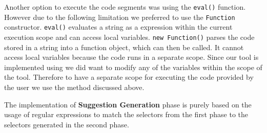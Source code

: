 Another option to execute the \javascript code segments was using the \texttt{eval()} function. However due to the following limitation we preferred to use the \texttt{Function} constructor. \texttt{eval()} evaluates a string as a \javascript expression within the current execution scope and can access local variables. \texttt{new Function()} parses the \javascript code stored in a string into a function object, which can then be called. It cannot access local variables because the code runs in a separate scope. Since our tool \dompletion is implemented using \javascript we did want to modify any of the \javascript variables within the scope of the tool. Therefore to have a separate scope for executing the code provided by the user we use the method discussed above.

The implementation of \textbf{Suggestion Generation} phase is purely based on the usage of regular expressions to match the \css selectors from the first phase to the \css selectors generated in the second phase.